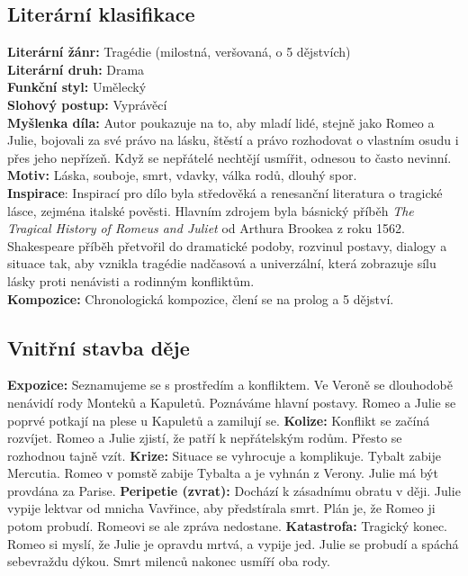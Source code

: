 \documentclass[12pt, a4paper]{article}
\newcommand{\mybf}[1]{\textcolor[RGB]{0, 179, 219}{\textbf{#1}}}
\begin{document}
\subsection*{Literární klasifikace}
\mybf{Literární žánr:} Tragédie (milostná, veršovaná, o 5 dějstvích)\\[3pt]
\mybf{Literární druh:} Drama\\[3pt]
\mybf{Funkční styl:} Umělecký\\[3pt]
\mybf{Slohový postup:} Vyprávěcí\\[10pt]
\mybf{Myšlenka díla:} Autor poukazuje na to, aby mladí lidé, stejně jako Romeo a Julie, bojovali za své právo na lásku, štěstí a právo rozhodovat o vlastním osudu i přes jeho nepřízeň. Když se nepřátelé nechtějí usmířit, odnesou to často nevinní.\\[10pt]
\mybf{Motiv:} Láska, souboje, smrt, vdavky, válka rodů, dlouhý spor.\\[10pt]
\mybf{Inspirace}: Inspirací pro dílo byla středověká a renesanční literatura o tragické lásce, zejména italské pověsti. Hlavním zdrojem byla básnický příběh \textit{The Tragical History of Romeus and Juliet} od Arthura Brookea z roku 1562. Shakespeare příběh přetvořil do dramatické podoby, rozvinul postavy, dialogy a situace tak, aby vznikla tragédie nadčasová a univerzální, která zobrazuje sílu lásky proti nenávisti a rodinným konfliktům.\\[10pt]
\mybf{Kompozice:} Chronologická kompozice, člení se na prolog a 5 dějství.

\subsection*{Vnitřní stavba děje}
\noindent\textbf{Expozice:} Seznamujeme se s prostředím a konfliktem. Ve Veroně se dlouhodobě nenávidí rody Monteků a Kapuletů. Poznáváme hlavní postavy. Romeo a Julie se poprvé potkají na plese u Kapuletů a zamilují se.
\noindent\textbf{Kolize:} Konflikt se začíná rozvíjet. Romeo a Julie zjistí, že patří k nepřátelským rodům. Přesto se rozhodnou tajně vzít.
\noindent\textbf{Krize:} Situace se vyhrocuje a komplikuje. Tybalt zabije Mercutia. Romeo v pomstě zabije Tybalta a je vyhnán z Verony. Julie má být provdána za Parise.
\noindent\textbf{Peripetie (zvrat):} Dochází k zásadnímu obratu v ději. Julie vypije lektvar od mnicha Vavřince, aby předstírala smrt. Plán je, že Romeo ji potom probudí. Romeovi se ale zpráva nedostane.
\noindent\textbf{Katastrofa:} Tragický konec. Romeo si myslí, že Julie je opravdu mrtvá, a vypije jed. Julie se probudí a spáchá sebevraždu dýkou. Smrt milenců nakonec usmíří oba rody.\\[10pt]
\end{document}
